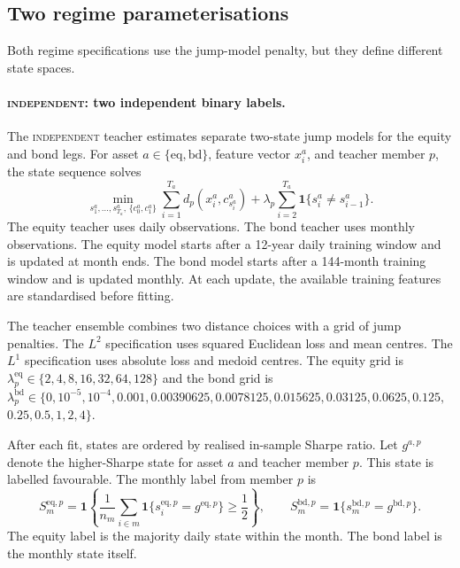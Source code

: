 \documentclass[10pt]{article}
\newcommand{\Bindep}{\textsc{independent}}
\begin{document}
\subsection{Two regime parameterisations}
\label{sec:two-parameterisations}

Both regime specifications use the jump-model penalty, but they define different state spaces.

\paragraph{\Bindep{}: two independent binary labels.}
The \Bindep{} teacher estimates separate two-state jump models for the equity and bond legs. For asset \(a\in\{\mathrm{eq},\mathrm{bd}\}\), feature vector \(x^a_i\), and teacher member \(p\), the state sequence solves
\begin{equation}
    \min_{s^a_1,\dots,s^a_{T_a},\,\{c^a_0,c^a_1\}}
    \sum_{i=1}^{T_a} d_p\!\left(x^a_i,c^a_{s^a_i}\right)
    +\lambda_p\sum_{i=2}^{T_a}\mathbf{1}\{s^a_i\neq s^a_{i-1}\}.
    \label{eq:independent-teacher}
\end{equation}
The equity teacher uses daily observations. The bond teacher uses monthly observations. The equity model starts after a 12-year daily training window and is updated at month ends. The bond model starts after a 144-month training window and is updated monthly. At each update, the available training features are standardised before fitting.

The teacher ensemble combines two distance choices with a grid of jump penalties. The \(L^2\) specification uses squared Euclidean loss and mean centres. The \(L^1\) specification uses absolute loss and medoid centres. The equity grid is $\lambda^{\mathrm{eq}}_p\in\{2,4,8,16,32,64,128\}$ and the bond grid is
$\lambda^{\mathrm{bd}}_p\in
    \{0,10^{-5},10^{-4},0.001,0.00390625,0.0078125,0.015625,
    0.03125,0.0625,0.125,$ $0.25,0.5,1,2,4\}.$

After each fit, states are ordered by realised in-sample Sharpe ratio. Let \(g^{a,p}\) denote the higher-Sharpe state for asset \(a\) and teacher member \(p\). This state is labelled favourable. The monthly label from member \(p\) is
\begin{equation}
    S^{\mathrm{eq},p}_m
    =
    \mathbf{1}\!\left\{
    \frac{1}{n_m}\sum_{i\in m}\mathbf{1}\{s^{\mathrm{eq},p}_i=g^{\mathrm{eq},p}\}
    \ge \frac{1}{2}
    \right\},
    \qquad
    S^{\mathrm{bd},p}_m
    =
    \mathbf{1}\{s^{\mathrm{bd},p}_m=g^{\mathrm{bd},p}\}.
    \label{eq:independent-monthly-label}
\end{equation}
The equity label is the majority daily state within the month. The bond label is the monthly state itself.
\end{document}

